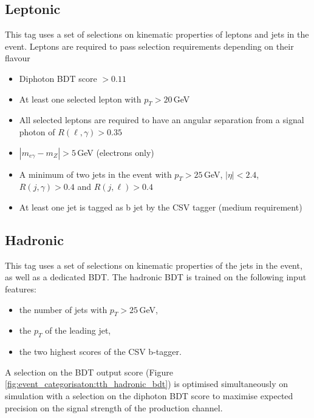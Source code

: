 \subsection{\ttH Leptonic}
This tag uses a set of selections on kinematic properties of leptons and jets in the event. 
Leptons are required to pass selection requirements depending on their flavour
\begin{itemize}[leftmargin=.5in,noitemsep]
    \item Diphoton BDT score $> 0.11$ 
    \item At least one selected lepton with $p_{T} > 20$\,GeV
    \item All selected leptons are required to have an angular separation from a signal photon of $R(\ell,\gamma) > 0.35$
    \item $|m_{e\gamma} - m_{Z}| > 5$\,GeV (electrons only)
    \item A minimum of two jets in the event with $p_{T} > 25$\,GeV, $|\eta| < 2.4$, $R(j,\gamma) > 0.4$ and $R(j,\ell) > 0.4$
    \item At least one jet is tagged as b jet by the CSV tagger (medium requirement)
\end{itemize}


\subsection{\ttH Hadronic}
This tag uses a set of selections on kinematic properties of the jets in the event, as well as a dedicated BDT. The \ttH hadronic BDT is trained on the following input features:
\begin{itemize}[leftmargin=.5in,noitemsep]
    \item the number of jets with $p_{T} > 25$\,GeV,
    \item the $p_{T}$ of the leading jet,
    \item the two highest scores of the CSV b-tagger.
\end{itemize}
A selection on the BDT output score (Figure \ref{fig:event_categorisaton:tth_hadronic_bdt}) is optimised simultaneously on simulation with a selection on the diphoton BDT score to maximise expected precision on the signal strength of the \ttH production channel. 

